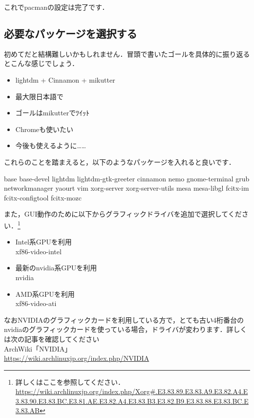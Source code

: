 \documentclass[b5j,twoside,openany]{jsbook}
\begin{document}
        これでpacmanの設定は完了です．

    \subsection{必要なパッケージを選択する}
      初めてだと結構難しいかもしれません．冒頭で書いたゴールを具体的に振り返るとこんな感じでしょう．
      \begin{itemize}
        \item lightdm + Cinnamon + mikutter
        \item 最大限日本語で
        \item ゴールはmikutterでﾂｲｯﾄ
        \item Chromeも使いたい
        \item 今後も使えるように……
      \end{itemize}
      これらのことを踏まえると，以下のようなパッケージを入れると良いです．
      \begin{screen}
        base base-devel lightdm lightdm-gtk-greeter cinnamon nemo gnome-terminal grub networkmanager yaourt vim xorg-server xorg-server-utils mesa mesa-libgl fcitx-im fcitx-configtool fcitx-mozc
      \end{screen}
      また，GUI動作のために以下からグラフィックドライバを追加で選択してください．\footnote{詳しくはここを参照してください． \url{https://wiki.archlinuxjp.org/index.php/Xorg#.E3.83.89.E3.83.A9.E3.82.A4.E3.83.90.E3.83.BC.E3.81.AE.E3.82.A4.E3.83.B3.E3.82.B9.E3.83.88.E3.83.BC.E3.83.AB}}
      \begin{screen}
        \begin{itemize}
          \item Intel系GPUを利用 \mbox{} \\
            xf86-video-intel
          \item 最新のnvidia系GPUを利用 \mbox{} \\
            nvidia
          \item AMD系GPUを利用 \mbox{} \\
            xf86-video-ati
        \end{itemize}
      \end{screen}
      なおNVIDIAのグラフィックカードを利用している方で，とても古い4桁番台のnvidiaのグラフィックカードを使っている場合，ドライバが変わります．詳しくは次の記事を確認してください \\

      ArchWiki「NVIDIA」\\
      \url{https://wiki.archlinuxjp.org/index.php/NVIDIA} \\
\end{document}
